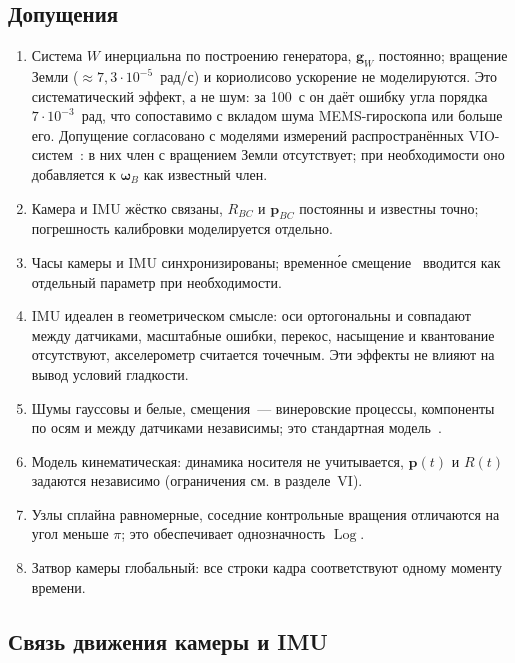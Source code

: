 \documentclass{misisarticle}
\newcommand{\Log}{\operatorname{Log}}
\newcommand{\vb}[1]{\mathbf{#1}}
\begin{document}
\subsection{Допущения}

\begin{enumerate}
  \item[Д1.] Система $W$ инерциальна по построению генератора, $\vb g_W$ постоянно; вращение Земли ($\approx7{,}3\cdot10^{-5}$~рад/с) и кориолисово ускорение не моделируются. Это систематический эффект, а не шум: за 100~с он даёт ошибку угла порядка $7\cdot10^{-3}$~рад, что сопоставимо с вкладом шума MEMS-гироскопа или больше его. Допущение согласовано с моделями измерений распространённых VIO-систем~\cite{vinsmono, openvins}: в них член с вращением Земли отсутствует; при необходимости оно добавляется к $\boldsymbol\omega_B$ как известный член.
  \item[Д2.] Камера и IMU жёстко связаны, $R_{BC}$ и $\vb p_{BC}$ постоянны и известны точно; погрешность калибровки моделируется отдельно.
  \item[Д3.] Часы камеры и IMU синхронизированы; временно́е смещение~\cite{furgale} вводится как отдельный параметр при необходимости.
  \item[Д4.] IMU идеален в геометрическом смысле: оси ортогональны и совпадают между датчиками, масштабные ошибки, перекос, насыщение и квантование отсутствуют, акселерометр считается точечным. Эти эффекты не влияют на вывод условий гладкости.
  \item[Д5.] Шумы гауссовы и белые, смещения~--- винеровские процессы, компоненты по осям и между датчиками независимы; это стандартная модель~\cite{furgale, forster}.
  \item[Д6.] Модель кинематическая: динамика носителя не учитывается, $\vb p(t)$ и $R(t)$ задаются независимо (ограничения см. в разделе~VI).
  \item[Д7.] Узлы сплайна равномерные, соседние контрольные вращения отличаются на угол меньше $\pi$; это обеспечивает однозначность $\Log$.
  \item[Д8.] Затвор камеры глобальный: все строки кадра соответствуют одному моменту времени.
\end{enumerate}

\subsection{Связь движения камеры и IMU}
\end{document}
